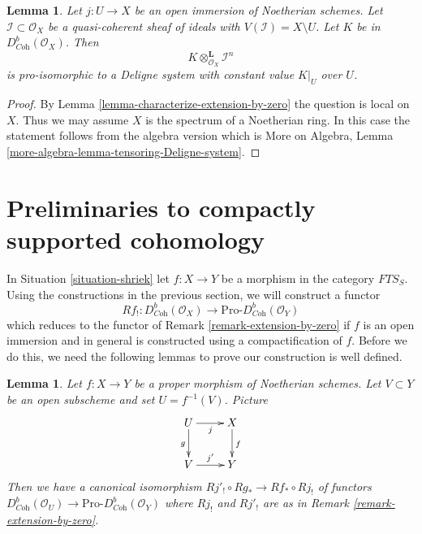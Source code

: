 \documentclass{stacks-project}
\theoremstyle{plain}
\newtheorem{lemma}[subsection]{Lemma}
\theoremstyle{definition}
\theoremstyle{remark}
\numberwithin{equation}{subsection}
\begin{document}
\begin{lemma}
\label{lemma-tensoring-Deligne-system}
Let $j : U \to X$ be an open immersion of Noetherian schemes. Let
$\mathcal{I} \subset \mathcal{O}_X$ be a quasi-coherent sheaf of
ideals with $V(\mathcal{I}) = X \setminus U$.
Let $K$ be in $D^b_{\textit{Coh}}(\mathcal{O}_X)$.
Then
$$
K \otimes_{\mathcal{O}_X}^\mathbf{L} \mathcal{I}^n
$$
is pro-isomorphic to a Deligne system with constant value $K|_U$ over $U$.
\end{lemma}

\begin{proof}
By Lemma \ref{lemma-characterize-extension-by-zero} the question is
local on $X$. Thus we may assume $X$ is the spectrum of a Noetherian
ring. In this case the statement follows from the algebra version which is
More on Algebra, Lemma \ref{more-algebra-lemma-tensoring-Deligne-system}.
\end{proof}







\section{Preliminaries to compactly supported cohomology}
\label{section-preliminaries-compactly-supported}

\noindent
In Situation \ref{situation-shriek} let $f : X \to Y$ be a morphism
in the category $\textit{FTS}_S$. Using the constructions in the
previous section, we will construct a functor
$$
Rf_! :
D^b_{\textit{Coh}}(\mathcal{O}_X)
\longrightarrow
\text{Pro-}D^b_{\textit{Coh}}(\mathcal{O}_Y)
$$
which reduces to the functor of Remark \ref{remark-extension-by-zero}
if $f$ is an open immersion and in general is constructed using a
compactification of $f$. Before we do this, we need the following lemmas
to prove our construction is well defined.

\begin{lemma}
\label{lemma-well-defined-pre}
Let $f : X \to Y$ be a proper morphism of Noetherian schemes.
Let $V \subset Y$ be an open subscheme and set $U = f^{-1}(V)$.
Picture
$$
\xymatrix{
U \ar[r]_j \ar[d]_g & X \ar[d]^f \\
V \ar[r]^{j'} & Y
}
$$
Then we have a canonical isomorphism $Rj'_! \circ Rg_* \to Rf_* \circ Rj_!$
of functors $D^b_{\textit{Coh}}(\mathcal{O}_U) \to
\text{Pro-}D^b_{\textit{Coh}}(\mathcal{O}_Y)$ where
$Rj_!$ and $Rj'_!$ are as in Remark \ref{remark-extension-by-zero}.
\end{lemma}
\end{document}
